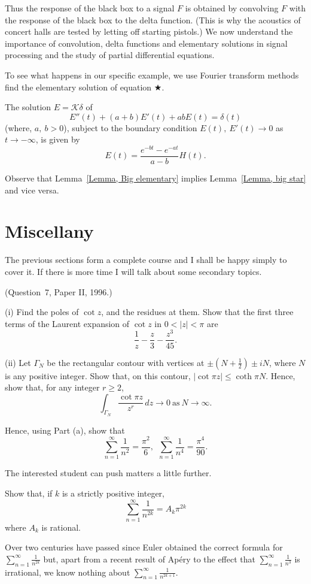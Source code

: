Thus the response of the black box to a signal $F$
is obtained by convolving $F$ with the response of
the black box to the delta function. (This is why
the acoustics of concert halls are tested by letting off
starting pistols.) We now understand the importance
of convolution, delta functions and elementary solutions
in signal processing and the study of partial differential
equations.

To see what happens in our specific example, we use Fourier
transform methods find the elementary solution
of equation $\bigstar$.
\begin{lemma}\label{Lemma, Big elementary}
The solution $E={\mathcal K}\delta$ of
\begin{equation*}
\tag*{$\bigstar$}
E''(t)+(a+b)E'(t)+ab E(t)=\delta(t)
\end{equation*}
(where, $a,\ b>0$), subject to the boundary condition
$E(t),\ E'(t)\rightarrow 0$ as $t\rightarrow -\infty$,
is given by
\[E(t)=\frac{e^{-bt}-e^{-at}}{a-b}H(t).\]
\end{lemma}
Observe that Lemma~\ref{Lemma, Big elementary}
implies Lemma~\ref{Lemma, big star} and vice versa.
\section{Miscellany} The previous sections form a complete
course and I shall be happy simply to cover it.
If there is more time I will talk about some secondary
topics.
\begin{example} (Question~7, Paper II, 1996.) 

(i) Find the poles of $\cot z$, and the residues at them.
Show that the first three terms of the Laurent expansion
of $\cot z$ in $0<|z|<\pi$ are
\[\frac{1}{z}-\frac{z}{3}-\frac{z^{3}}{45}.\]

(ii) Let $\Gamma_{N}$ be the rectangular contour with
vertices at $\pm(N+\frac{1}{2})\pm iN$, where $N$
is any positive integer. Show that, on this contour,
$|\cot\pi z|\leq\coth \pi N$. Hence, show that, for any
integer $r\geq 2$,
\[\int_{\Gamma_{N}}\frac{\cot\pi z}{z^{r}}\,dz
\rightarrow 0\ \text{as}\ N\rightarrow\infty.\]

Hence, using Part (a), show that
\[\sum_{n=1}^{\infty}\frac{1}{n^{2}}=\frac{\pi^{2}}{6},
\ \ \sum_{n=1}^{\infty}\frac{1}{n^{4}}=\frac{\pi^{4}}{90}.\]
\end{example}
The interested student can push matters a little further.
\begin{exercise} Show that, if $k$ is a strictly positive integer,
\[\sum_{n=1}^{\infty}\frac{1}{n^{2k}}=A_{k}\pi^{2k}\]
where $A_{k}$ is rational.
\end{exercise}
Over two centuries have passed since Euler obtained
the correct formula for $\sum_{n=1}^{\infty}\frac{1}{n^{2k}}$
but, apart from a recent result of Ap{\'e}ry to the
effect that $\sum_{n=1}^{\infty}\frac{1}{n^{3}}$ is
irrational, we know nothing about
$\sum_{n=1}^{\infty}\frac{1}{n^{2k+1}}$. 

